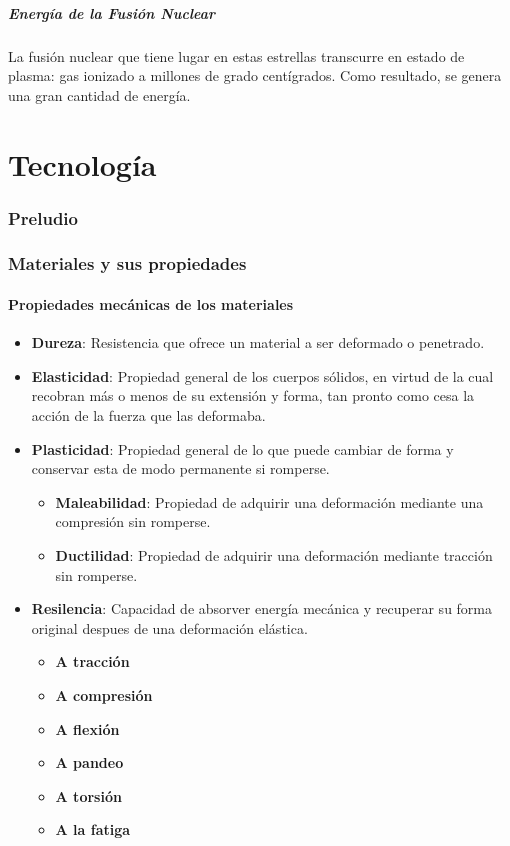 \documentclass[10pt]{article}
\begin{document}
\subsubsection{Energía de la Fusión Nuclear}

La fusión nuclear que tiene lugar en estas estrellas transcurre en estado de plasma: gas ionizado a millones de grado centígrados. Como resultado, se genera una gran cantidad de energía.

\newpage

\part{Tecnología}

\section{Preludio}

\section{Materiales y sus propiedades}

\subsection{Propiedades mecánicas de los materiales}

\begin{itemize}
  \item \textbf{Dureza}: Resistencia que ofrece un material a ser deformado o penetrado.
  \item \textbf{Elasticidad}: Propiedad general de los cuerpos sólidos, en virtud de la cual recobran más o menos de su extensión y forma, tan pronto como cesa la acción de la fuerza que las deformaba.
  \item \textbf{Plasticidad}: Propiedad general de lo que puede cambiar de forma y conservar esta de modo permanente si romperse.
  \begin{itemize}
    \item \textbf{Maleabilidad}: Propiedad de adquirir una deformación mediante una compresión sin romperse.
    \item \textbf{Ductilidad}: Propiedad de adquirir una deformación mediante tracción sin romperse.
  \end{itemize}
  \item \textbf{Resilencia}: Capacidad de absorver energía mecánica y recuperar su forma original despues de una deformación elástica.
  \begin{itemize}
    \item \textbf{A tracción}
    \item \textbf{A compresión}
    \item \textbf{A flexión}
    \item \textbf{A pandeo}
    \item \textbf{A torsión}
    \item \textbf{A la fatiga}
  \end{itemize}
\end{itemize}
\end{document}
